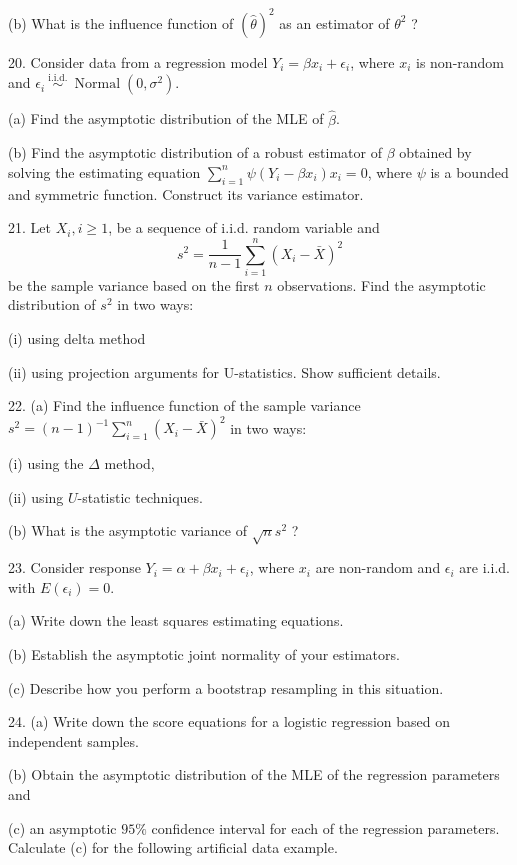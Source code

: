 \documentclass[11pt]{article}
\theoremstyle{definition}
\begin{document}
(b) What is the influence function of $(\widehat{\theta})^2$ as an estimator of $\theta^2$ ?

20. Consider data from a regression model $Y_i= \beta x_i+\epsilon_i$, where $x_i$ is non-random and $\epsilon_i \stackrel{\text { i.i.d. }}{\sim} \operatorname{Normal}\left(0, \sigma^2\right)$.

(a) Find the asymptotic distribution of the MLE of $\hat{\beta}$.

(b) Find the asymptotic distribution of a robust estimator of $\beta$ obtained by solving the estimating equation $\sum_{i=1}^n \psi\left(Y_i-\beta x_i\right) x_i=0$, where $\psi$ is a bounded and symmetric function. Construct its variance estimator.

21. Let $X_i, i \geq 1$, be a sequence of i.i.d. random variable and
$$
s^2=\frac{1}{n-1} \sum_{i=1}^n\left(X_i-\bar{X}\right)^2
$$
be the sample variance based on the first $n$ observations.
Find the asymptotic distribution of $s^2$ in two ways: 

(i) using delta method

(ii) using projection arguments for U-statistics. Show sufficient details.

22. (a) Find the influence function of the sample variance $s^2=(n-1)^{-1} \sum_{i=1}^n\left(X_i-\bar{X}\right)^2$ in two ways: 

(i) using the $\Delta$ method, 

(ii) using $U$-statistic techniques.

(b) What is the asymptotic variance of $\sqrt{n} s^2$ ?

23. Consider response $Y_i=\alpha+\beta x_i+\epsilon_i$, where $x_i$ are non-random and $\epsilon_i$ are i.i.d. with $E\left(\epsilon_i\right)=0$.

(a) Write down the least squares estimating equations.

(b) Establish the asymptotic joint normality of your estimators.

(c) Describe how you perform a bootstrap resampling in this situation.

24. (a) Write down the score equations for a logistic regression based on independent samples. 

(b) Obtain the asymptotic distribution of the MLE of the regression parameters and 

(c) an asymptotic $95 \%$ confidence interval for each of the regression parameters.
Calculate (c) for the following artificial data example.
\end{document}
